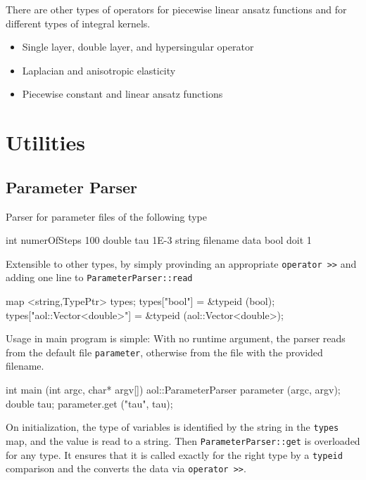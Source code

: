 There are other types of operators for piecewise linear ansatz functions and for different types of integral kernels.

\begin {itemize}

\item Single layer, double layer, and hypersingular operator

\item Laplacian and anisotropic elasticity

\item Piecewise constant and linear ansatz functions

\end {itemize}

\section {Utilities}

\subsection {Parameter Parser}

Parser for parameter files of the following type
\begin{myverbatim}
int     numerOfSteps  100
double  tau           1E-3
string  filename      data
bool    doit          1
\end{myverbatim}

Extensible to other types, by simply provinding an appropriate \lstinline$operator >>$
and adding one line to \lstinline$ParameterParser::read$
\begin{myverbatim}
map <string,TypePtr> types;
types["bool"]                  = &typeid (bool);
types["aol::Vector<double>"]   = &typeid (aol::Vector<double>);
\end{myverbatim}



Usage in main program is simple: With no runtime argument, the parser reads from
the default file \lstinline$parameter$, otherwise from the file with the provided filename.

\begin {myverbatim}
int main (int argc, char* argv[])
{
  aol::ParameterParser parameter (argc, argv);
  double tau;
  parameter.get ("tau", tau);
}
\end{myverbatim}

On initialization, the type of variables is identified by the string in the \lstinline$types$ map,
and the value is read to a string.
Then \lstinline$ParameterParser::get$ is overloaded for any type. It ensures that it is called exactly
for the right type by a \lstinline$typeid$ comparison and the converts the data via \lstinline$operator >>$.

